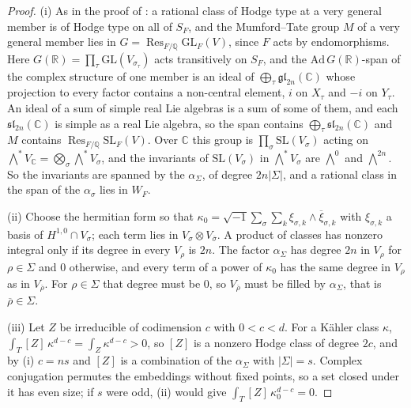\documentclass[11pt,reqno]{amsart}
\theoremstyle{plain}
\theoremstyle{definition}
\theoremstyle{remark}
\newcommand{\QQ}{\mathbb{Q}}
\newcommand{\RR}{\mathbb{R}}
\newcommand{\CC}{\mathbb{C}}
\DeclareMathOperator{\Res}{Res}
\newcommand{\bbar}[1]{\overline{#1}}
\begin{document}
\begin{proof}
(i) As in the proof of : a rational class of Hodge
type at a very general member is of Hodge type on all of $S_{F}$, and the
Mumford--Tate group $M$ of a very general member lies in
$G=\Res_{F/\QQ}\mathrm{GL}_{F}(V)$, since $F$ acts by endomorphisms. Here
$G(\RR)=\prod_{\tau}\mathrm{GL}(V_{\sigma_{\tau}})$ acts transitively on
$S_{F}$, and the $\mathrm{Ad}\,G(\RR)$-span of the complex structure of one
member is an ideal of $\bigoplus_{\tau}\mathfrak{gl}_{2n}(\CC)$ whose
projection to every factor contains a non-central element, $i$ on $X_{\tau}$
and $-i$ on $Y_{\tau}$. An ideal of a sum of simple real Lie algebras is a
sum of some of them, and each $\mathfrak{sl}_{2n}(\CC)$ is simple as a real
Lie algebra, so the span contains $\bigoplus_{\tau}\mathfrak{sl}_{2n}(\CC)$
and $M$ contains $\Res_{F/\QQ}\mathrm{SL}_{F}(V)$. Over $\CC$ this group is
$\prod_{\sigma}\mathrm{SL}(V_{\sigma})$ acting on
$\bigwedge^{*}V_{\CC}=\bigotimes_{\sigma}\bigwedge^{*}V_{\sigma}$, and the
invariants of $\mathrm{SL}(V_{\sigma})$ in $\bigwedge^{*}V_{\sigma}$ are
$\bigwedge^{0}$ and $\bigwedge^{2n}$. So the invariants are spanned by the
$\alpha_{\Sigma}$, of degree $2n|\Sigma|$, and a rational class in the span
of the $\alpha_{\sigma}$ lies in $W_{F}$.

(ii) Choose the hermitian form so that $\kappa_{0}=
\sqrt{-1}\sum_{\sigma}\sum_{k}\xi_{\sigma,k}\wedge\bbar\xi_{\sigma,k}$ with
$\xi_{\sigma,k}$ a basis of $H^{1,0}\cap V_{\sigma}$; each term lies in
$V_{\sigma}\otimes V_{\bbar\sigma}$. A product of classes has nonzero
integral only if its degree in every $V_{\rho}$ is $2n$. The factor
$\alpha_{\Sigma}$ has degree $2n$ in $V_{\rho}$ for $\rho\in\Sigma$ and $0$
otherwise, and every term of a power of $\kappa_{0}$ has the same degree in
$V_{\rho}$ as in $V_{\bbar\rho}$. For $\rho\in\Sigma$ that degree must be
$0$, so $V_{\bbar\rho}$ must be filled by $\alpha_{\Sigma}$, that is
$\bbar\rho\in\Sigma$.

(iii) Let $Z$ be irreducible of codimension $c$ with $0<c<d$. For a K\"ahler
class $\kappa$, $\int_{T}[Z]\,\kappa^{d-c}=\int_{Z}\kappa^{d-c}>0$, so $[Z]$ is
a nonzero Hodge class of degree $2c$, and by (i) $c=ns$ and $[Z]$ is a
combination of the $\alpha_{\Sigma}$ with $|\Sigma|=s$. Complex conjugation
permutes the embeddings without fixed points, so a set closed under it has
even size; if $s$ were odd, (ii) would give $\int_{T}[Z]\,\kappa_{0}^{d-c}=0$.
\end{proof}
\end{document}
